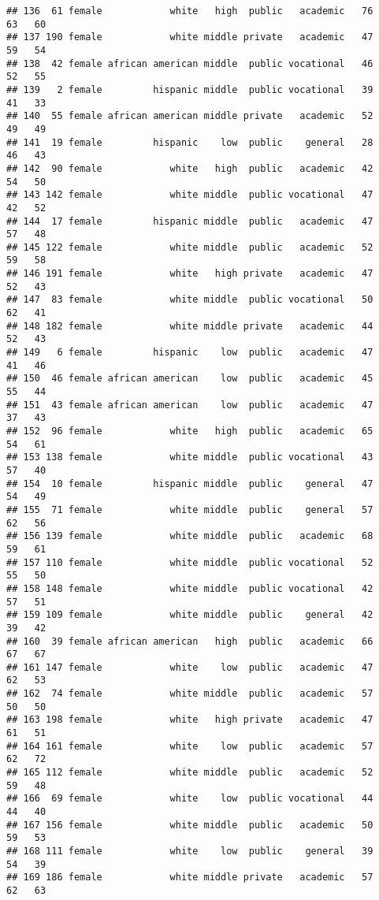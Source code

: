 \documentclass[
]{article}
\begin{document}
\begin{verbatim}
## 136  61 female            white   high  public   academic   76    63   60
## 137 190 female            white middle private   academic   47    59   54
## 138  42 female african american middle  public vocational   46    52   55
## 139   2 female         hispanic middle  public vocational   39    41   33
## 140  55 female african american middle private   academic   52    49   49
## 141  19 female         hispanic    low  public    general   28    46   43
## 142  90 female            white   high  public   academic   42    54   50
## 143 142 female            white middle  public vocational   47    42   52
## 144  17 female         hispanic middle  public   academic   47    57   48
## 145 122 female            white middle  public   academic   52    59   58
## 146 191 female            white   high private   academic   47    52   43
## 147  83 female            white middle  public vocational   50    62   41
## 148 182 female            white middle private   academic   44    52   43
## 149   6 female         hispanic    low  public   academic   47    41   46
## 150  46 female african american    low  public   academic   45    55   44
## 151  43 female african american    low  public   academic   47    37   43
## 152  96 female            white   high  public   academic   65    54   61
## 153 138 female            white middle  public vocational   43    57   40
## 154  10 female         hispanic middle  public    general   47    54   49
## 155  71 female            white middle  public    general   57    62   56
## 156 139 female            white middle  public   academic   68    59   61
## 157 110 female            white middle  public vocational   52    55   50
## 158 148 female            white middle  public vocational   42    57   51
## 159 109 female            white middle  public    general   42    39   42
## 160  39 female african american   high  public   academic   66    67   67
## 161 147 female            white    low  public   academic   47    62   53
## 162  74 female            white middle  public   academic   57    50   50
## 163 198 female            white   high private   academic   47    61   51
## 164 161 female            white    low  public   academic   57    62   72
## 165 112 female            white middle  public   academic   52    59   48
## 166  69 female            white    low  public vocational   44    44   40
## 167 156 female            white middle  public   academic   50    59   53
## 168 111 female            white    low  public    general   39    54   39
## 169 186 female            white middle private   academic   57    62   63

\end{verbatim}
\end{document}
